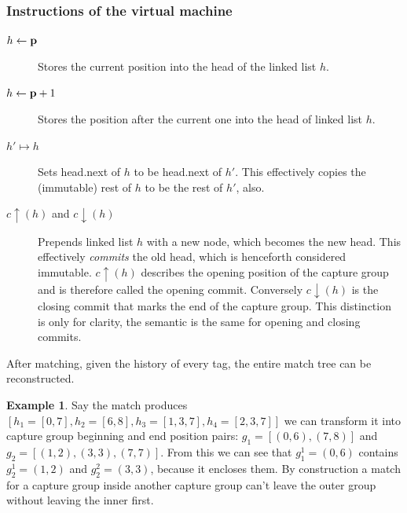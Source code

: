 \documentclass[english]{sigplanconf}
\theoremstyle{definition}
\newtheorem{example}{Example}[section]
\begin{document}
\subsubsection{Instructions of the virtual machine}
\label{instructions}
\begin{description}
\item [$h\leftarrow\mathbf{\mathbf{p}}$] Stores the current position into the head of the linked list $h$.
\item [$h\leftarrow\mathbf{\mathbf{p}}+1$] Stores the position after the current one into the head of linked list $h$.
\item [$h'\mapsto h$] Sets head.next of $h$ to be head.next of $h'$. 
	This effectively copies the (immutable) rest of $h$ to be the rest of $h'$, also. 
\item [$c\uparrow(h)$ and $c\downarrow(h)$] Prepends linked list $h$ with a new node, which becomes the new head.
This effectively \emph{commits} the old head, which is henceforth considered immutable. $c\uparrow(h)$ 
describes the opening position of the capture group and is therefore called the opening commit. 
Conversely $c\downarrow(h)$ is the closing commit that marks the end of the capture group. 
This distinction is only for clarity, the semantic is the same for opening and closing commits.
\end{description}

After matching, given the history of every tag, the entire match tree can be reconstructed.

\begin{example}
Say the match produces $[h_1=[0,7],h_2=[6,8], h_3=[1,3,7], h_4=[2,3,7]]$ we can transform it into capture group beginning and end position pairs: $g_1 = [(0,6),(7,8)]$ and $g_2=[(1,2), (3,3),(7,7)]$. From this we can see that $g_1^1=(0,6)$ contains $g_2^1=(1,2)$ and $g_2^2=(3,3)$, because it encloses them. By construction a match for a capture group 
inside another capture group can't leave the outer group 
without leaving the inner first.
\end{example}
\end{document}
